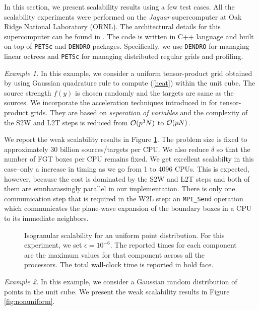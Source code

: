 In this section, we present scalability results using a few test cases.  All the scalability experiments were performed 
on the {\it{Jaguar}} supercomputer at Oak Ridge National Laboratory (ORNL). The architectural details for this supercomputer
 can be found in \cite{jaguar}. The code is written in C++ language and built on top of \texttt{PETSc} and \texttt{DENDRO} packages. 
 Specifically, we use \texttt{DENDRO} for managing linear octrees and \texttt{PETSc} for managing distributed regular grids and profiling. 


{\em Example 1.} In this example, we consider a uniform tensor-product grid obtained by using Gaussian quadrature rule to compute (\ref{heat}) within the unit cube. The source strength $f(y)$ is chosen randomly and the targets are same as the sources. We incorporate the acceleration techniques introduced in \cite{fggt} for tensor-product grids. They are based on 
{\em seperation of variables} and the complexity of the S2W and L2T steps is reduced from $\mathcal{O}(p^3 N)$ to $\mathcal{O}(p N)$. 

We report the weak scalability results in Figure \ref{fig:uniform}. The problem size is fixed to approximately 30 billion sources/targets per CPU. We also reduce $\delta$ so that the number of FGT boxes per CPU remains fixed. We get excellent scalabilty in this case--only a  increase in timing as we go from 1 to 4096 CPUs. This is expected, however, because the cost is dominated by the S2W and L2T steps and both of them are emnbarassingly parallel in our implementation. There is only one communication step that is required in the W2L step: an \texttt{MPI\_Send} operation which communicates the plane-wave expansion of the boundary boxes in a CPU to its immediate neighbors. 

\begin{figure}
	\begin{center}
	
	\end{center}
\caption{\label{f:isoUniform} Isogranular scalability for an uniform point distribution. For
 this experiment, we set $\epsilon = 10^{-6}$. The reported times for 
each component are the maximum values for that component across all the processors. The total wall-clock
time is reported in bold face.} \label{fig:uniform}
\end{figure}

{\em Example 2.} In this example, we consider a Gaussian random distribution of points in the unit cube. 
We present the weak scalability results in Figure \ref{fig:nonuniform}. 

